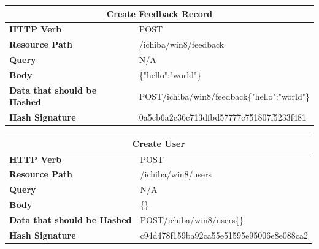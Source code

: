 \begin{center}
\begin{tabular}{|l||l|}

\hline
\multicolumn{2}{|c|}{\textbf{Create Feedback Record}} \\
\hline
\textbf{HTTP Verb}                  & POST \\
\hline
\textbf{Resource Path}              & /ichiba/win8/feedback \\
\hline
\textbf{Query}                      & N/A \\
\hline
\textbf{Body}                       & \{"hello":"world"\} \\
\hline
\textbf{Data that should be Hashed} & POST/ichiba/win8/feedback\{"hello":"world"\} \\
\hline
\textbf{Hash Signature}             & 0a5cb6a2c36c713dfbd57777c751807f5233f481 \\
\hline

\end{tabular}
\end{center}

\begin{center}
\begin{tabular}{|l||l|}

\hline
\multicolumn{2}{|c|}{\textbf{Create User}} \\
\hline
\textbf{HTTP Verb}                  & POST \\
\hline
\textbf{Resource Path}              & /ichiba/win8/users \\
\hline
\textbf{Query}                      & N/A \\
\hline
\textbf{Body}                       & \{\} \\
\hline
\textbf{Data that should be Hashed} & POST/ichiba/win8/users\{\} \\
\hline
\textbf{Hash Signature}             & c94d478f159ba92ca55e51595e95006e8e088ca2 \\
\hline

\end{tabular}
\end{center}

